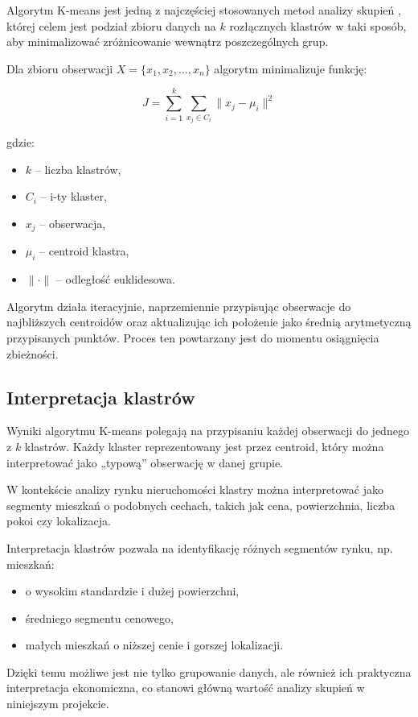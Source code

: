 \documentclass{report}
\begin{document}
Algorytm K-means jest jedną z najczęściej stosowanych metod analizy skupień \cite{macqueen1967,jain1999,hastie2009}, której celem jest podział zbioru danych na \(k\) rozłącznych klastrów w taki sposób, aby minimalizować zróżnicowanie wewnątrz poszczególnych grup.

Dla zbioru obserwacji \(X = \{x_1, x_2, \dots, x_n\}\) algorytm minimalizuje funkcję:

\[
J = \sum_{i=1}^{k} \sum_{x_j \in C_i} \|x_j - \mu_i\|^2
\]

gdzie:
\begin{itemize}
    \item \(k\) -- liczba klastrów,
    \item \(C_i\) -- i-ty klaster,
    \item \(x_j\) -- obserwacja,
    \item \(\mu_i\) -- centroid klastra,
    \item \(\|\cdot\|\) -- odległość euklidesowa.
\end{itemize}

Algorytm działa iteracyjnie, naprzemiennie przypisując obserwacje do najbliższych centroidów oraz aktualizując ich położenie jako średnią arytmetyczną przypisanych punktów. Proces ten powtarzany jest do momentu osiągnięcia zbieżności.

\subsection{Interpretacja klastrów}

Wyniki algorytmu K-means polegają na przypisaniu każdej obserwacji do jednego z \(k\) klastrów. Każdy klaster reprezentowany jest przez centroid, który można interpretować jako „typową” obserwację w danej grupie.

W kontekście analizy rynku nieruchomości klastry można interpretować jako segmenty mieszkań o podobnych cechach, takich jak cena, powierzchnia, liczba pokoi czy lokalizacja.

Interpretacja klastrów pozwala na identyfikację różnych segmentów rynku, np. mieszkań:
\begin{itemize}
    \item o wysokim standardzie i dużej powierzchni,
    \item średniego segmentu cenowego,
    \item małych mieszkań o niższej cenie i gorszej lokalizacji.
\end{itemize}

Dzięki temu możliwe jest nie tylko grupowanie danych, ale również ich praktyczna interpretacja ekonomiczna, co stanowi główną wartość analizy skupień w niniejszym projekcie.
\end{document}
